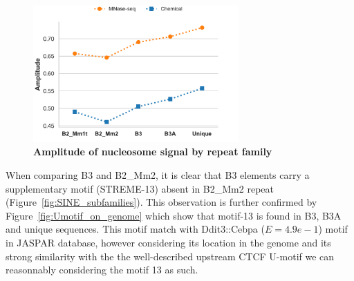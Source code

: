 \documentclass[11pt]{book}
\begin{document}
\begin{figure}[htbp]
    \centering
    \includegraphics[width=0.7\textwidth]{Figures/Results/ctcf_amplitude_byrepname.pdf}
    \caption{\textbf{Amplitude of nucleosome signal by repeat family}} 
    \label{fig:ctcf_amplitude_byrepname}
\end{figure}

\FloatBarrier
When comparing B3 and B2\_Mm2, it is clear that B3 elements carry a supplementary motif (STREME-13) absent in B2\_Mm2 repeat (Figure~\ref{fig:SINE_subfamilies}).
This observation is further confirmed by Figure~\ref{fig:Umotif_on_genome} which show that motif-13 is found in B3, B3A and unique sequences. This motif match with Ddit3::Cebpa ($E=4.9e-1$) motif in JASPAR database, however considering its location in the genome and its strong similarity with the the well-described upstream CTCF U-motif \cite{schmidt_waves_2012, soochit_ctcf_2021, do_binding_2025} we can reasonnably considering the motif 13 as such.
\end{document}
